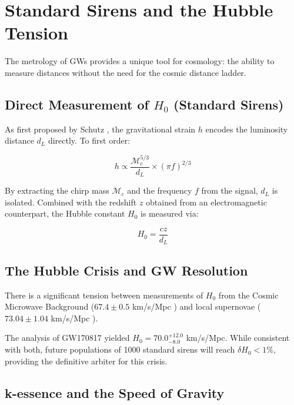 \documentclass[11pt,a4paper,spanish]{book}
\numberwithin{equation}{chapter}
\numberwithin{figure}{chapter}
\numberwithin{equation}{chapter}
\numberwithin{figure}{chapter}
\numberwithin{table}{chapter}
\begin{document}
\section{Standard Sirens and the Hubble Tension}

The metrology of GWs provides a unique tool for cosmology: the ability to measure distances without the need for the cosmic distance ladder.

\subsection{Direct Measurement of $H_0$ (Standard Sirens)}

As first proposed by Schutz \cite{Schutz_1986}, the gravitational strain $h$ encodes the luminosity distance $d_L$ directly. To first order:

\begin{equation}
h \propto \frac{\mathcal{M}_c^{5/3}}{d_L} \times (\pi f)^{2/3}
\end{equation}

By extracting the chirp mass $\mathcal{M}_c$ and the frequency $f$ from the signal, $d_L$ is isolated. Combined with the redshift $z$ obtained from an electromagnetic counterpart, the Hubble constant $H_0$ is measured via:

\begin{equation}
H_0 = \frac{c z}{d_L}
\end{equation}

\subsection{The Hubble Crisis and GW Resolution}

There is a significant tension between measurements of $H_0$ from the Cosmic Microwave Background ($67.4 \pm 0.5$ km/s/Mpc \cite{Planck_2020}) and local supernovae ($73.04 \pm 1.04$ km/s/Mpc \cite{Riess_2022}). 



The analysis of GW170817 \cite{Abbott_2017c} yielded $H_0 = 70.0^{+12.0}_{-8.0}$ km/s/Mpc. While consistent with both, future populations of 1000 standard sirens will reach $\delta H_0 < 1\%$, providing the definitive arbiter for this crisis.

\subsection{k-essence and the Speed of Gravity}
\end{document}
